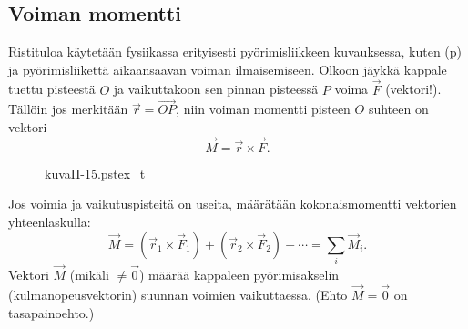 \subsection{Voiman momentti}

Ristituloa käytetään fysiikassa erityisesti pyörimisliikkeen kuvauksessa, kuten 
(p) ja pyörimisliikettä aikaansaavan voiman  
ilmaisemiseen. Olkoon jäykkä kappale tuettu pisteestä $O$ ja vaikuttakoon sen pinnan pisteessä 
$P$ voima $\vec F$ (vektori!). Tällöin jos merkitään $\vec r = \overrightarrow{OP}$, niin 
voiman momentti pisteen $O$ suhteen on vektori
\[
\vec M = \vec r \times \vec F.
\]
\begin{figure}[H]
\begin{center}
{kuvaII-15.pstex_t}
\end{center}
\end{figure}
Jos voimia ja vaikutuspisteitä on useita, määrätään kokonaismomentti vektorien yhteenlaskulla:
\[
\vec M=(\vec r_1 \times \vec F_1) + (\vec r_2 \times \vec F_2) + \cdots = \sum_i\vec M_i.
\]
Vektori $\vec M$ (mikäli $\neq \vec 0$) määrää kappaleen pyörimisakselin (kulmanopeusvektorin)
suunnan voimien vaikuttaessa. (Ehto $\vec M = \vec 0$ on tasapainoehto.)
